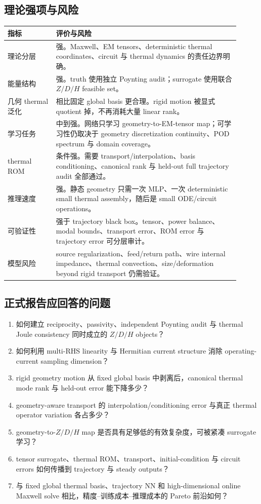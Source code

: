 \subsection{理论强项与风险}
\begin{center}
\begin{tabular}{p{0.19\linewidth}p{0.72\linewidth}}
\toprule
指标 & 评价与风险 \\
\midrule
理论分层 & 强。Maxwell、EM tensors、deterministic thermal coordinates、circuit 与 thermal dynamics 的责任边界明确。 \\
能量结构 & 强。truth 使用独立 Poynting audit；surrogate 使用联合 $Z/D/H$ feasible set。 \\
几何 thermal 泛化 & 相比固定 global basis 更合理。rigid motion 被显式 quotient 掉，不再消耗大量 linear rank。 \\
学习任务 & 中到强。网络只学习 geometry-to-EM-tensor map；可学习性仍取决于 geometry discretization continuity、POD spectrum 与 domain coverage。 \\
thermal ROM & 条件强。需要 transport/interpolation、basis conditioning、canonical rank 与 held-out full trajectory audit 全部通过。 \\
推理速度 & 强。静态 geometry 只需一次 MLP、一次 deterministic small thermal assembly，随后是 small ODE/circuit operations。 \\
可验证性 & 强于 trajectory black box。tensor、power balance、modal bounds、transport error、ROM error 与 trajectory error 可分层审计。 \\
模型风险 & source regularization、feed/return path、wire internal impedance、thermal convection、size/deformation beyond rigid transport 仍需验证。 \\
\bottomrule
\end{tabular}
\end{center}

\subsection{正式报告应回答的问题}
\begin{enumerate}
  \item 如何建立 reciprocity、passivity、independent Poynting audit 与 thermal Joule consistency 同时成立的 $Z/D/H$ objects？
  \item 如何利用 multi-RHS linearity 与 Hermitian current structure 消除 operating-current sampling dimension？
  \item rigid geometry motion 从 fixed global basis 中剥离后，canonical thermal mode rank 与 held-out error 能下降多少？
  \item geometry-aware transport 的 interpolation/conditioning error 与真正 thermal operator variation 各占多少？
  \item geometry-to-$Z/D/H$ map 是否具有足够低的有效复杂度，可被紧凑 surrogate 学习？
  \item tensor surrogate、thermal ROM、transport、initial-condition 与 circuit errors 如何传播到 trajectory 与 steady outputs？
  \item 与 fixed global thermal basis、trajectory NN 和 high-dimensional online Maxwell solve 相比，精度--训练成本--推理成本的 Pareto 前沿如何？
\end{enumerate}

